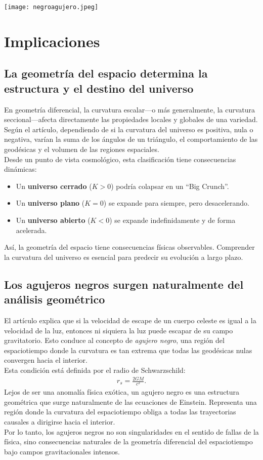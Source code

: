 \documentclass{aleph-revista}
\begin{document}
\begin{center}
  \texttt{[image: negroagujero.jpeg]}
\end{center}

\section{Implicaciones}
\subsection*{La geometría del espacio determina la estructura y el destino del universo}
En geometría diferencial, la curvatura escalar—o más generalmente, la curvatura seccional—afecta directamente las propiedades locales y globales de una variedad. Según el artículo, dependiendo de si la curvatura del universo es positiva, nula o negativa, varían la suma de los ángulos de un triángulo, el comportamiento de las geodésicas y el volumen de las regiones espaciales.\\
Desde un punto de vista cosmológico, esta clasificación tiene consecuencias dinámicas:
\begin{itemize}
  \item Un \textbf{universo cerrado} ($K > 0$) podría colapsar en un “Big Crunch”.
  \item Un \textbf{universo plano} ($K = 0$) se expande para siempre, pero desacelerando.
  \item Un \textbf{universo abierto} ($K < 0$) se expande indefinidamente y de forma acelerada.
\end{itemize}
Así, la geometría del espacio tiene consecuencias físicas observables. Comprender la curvatura del universo es esencial para predecir su evolución a largo plazo.
\subsection*{Los agujeros negros surgen naturalmente del análisis geométrico}
El artículo explica que si la velocidad de escape de un cuerpo celeste es igual a la velocidad de la luz, entonces ni siquiera la luz puede escapar de su campo gravitatorio. Esto conduce al concepto de \textit{agujero negro}, una región del espaciotiempo donde la curvatura es tan extrema que todas las geodésicas nulas convergen hacia el interior.\\
Esta condición está definida por el radio de Schwarzschild:
\begin{align*}
r_s = \frac{2GM}{c^2}.
\end{align*}
Lejos de ser una anomalía física exótica, un agujero negro es una estructura geométrica que surge naturalmente de las ecuaciones de Einstein. Representa una región donde la curvatura del espaciotiempo obliga a todas las trayectorias causales a dirigirse hacia el interior.\\
Por lo tanto, los agujeros negros no son singularidades en el sentido de fallas de la física, sino consecuencias naturales de la geometría diferencial del espaciotiempo bajo campos gravitacionales intensos.
\end{document}
